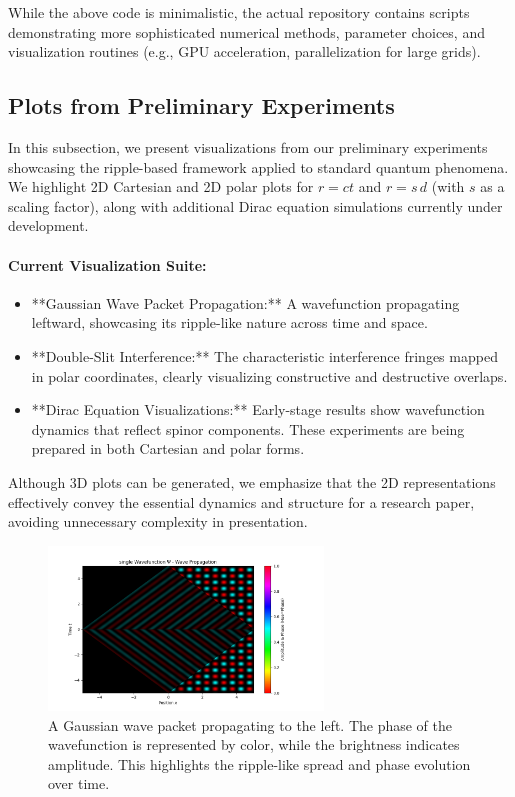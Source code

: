 \documentclass{article}
\begin{document}
While the above code is minimalistic, the actual repository contains 
scripts demonstrating more sophisticated numerical methods, parameter 
choices, and visualization routines (e.g., GPU acceleration, 
parallelization for large grids).

\subsection{Plots from Preliminary Experiments}
\label{app:subsec:plots}

In this subsection, we present visualizations from our preliminary experiments showcasing the ripple-based framework applied to standard quantum phenomena. We highlight 2D Cartesian and 2D polar plots for \(r = ct\) and \(r = s \, d\) (with \(s\) as a scaling factor), along with additional Dirac equation simulations currently under development.

\paragraph{Current Visualization Suite:}
\begin{itemize}
  \item **Gaussian Wave Packet Propagation:** A wavefunction propagating leftward, showcasing its ripple-like nature across time and space.
  \item **Double-Slit Interference:** The characteristic interference fringes mapped in polar coordinates, clearly visualizing constructive and destructive overlaps.
  \item **Dirac Equation Visualizations:** Early-stage results show wavefunction dynamics that reflect spinor components. These experiments are being prepared in both Cartesian and polar forms.
\end{itemize}

Although 3D plots can be generated, we emphasize that the 2D representations effectively convey the essential dynamics and structure for a research paper, avoiding unnecessary complexity in presentation.

\begin{figure}[htbp]
  \centering
  \includegraphics[width=0.65\textwidth]{images/single_wavefunction_probability_density_with_phase.png}
  \caption{A Gaussian wave packet propagating to the left. The phase of the wavefunction is represented by color, while the brightness indicates amplitude. This highlights the ripple-like spread and phase evolution over time.}
  \label{fig:gaussian_example}
\end{figure}
\end{document}
